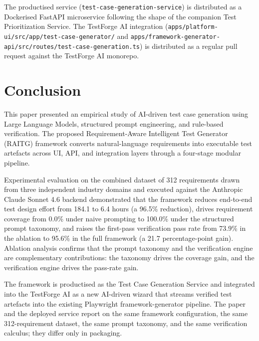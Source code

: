 \documentclass[conference]{IEEEtran}
\begin{document}
The productised service (\texttt{test-case-generation-service}) is distributed as a Dockerised FastAPI microservice following the shape of the companion Test Prioritization Service. The TestForge AI integration (\texttt{apps/platform-ui/src/app/test-case-generator/} and \texttt{apps/framework-generator-api/src/routes/test-case-generation.ts}) is distributed as a regular pull request against the TestForge AI monorepo.

\section{Conclusion}
\label{sec:conclusion}

This paper presented an empirical study of AI-driven test case generation using Large Language Models, structured prompt engineering, and rule-based verification. The proposed Requirement-Aware Intelligent Test Generator (RAITG) framework converts natural-language requirements into executable test artefacts across UI, API, and integration layers through a four-stage modular pipeline.

Experimental evaluation on the combined dataset of 312 requirements drawn from three independent industry domains and executed against the Anthropic Claude Sonnet 4.6 backend demonstrated that the framework reduces end-to-end test design effort from 184.1 to 6.4 hours (a 96.5\% reduction), drives requirement coverage from 0.0\% under naive prompting to 100.0\% under the structured prompt taxonomy, and raises the first-pass verification pass rate from 73.9\% in the ablation to 95.6\% in the full framework (a 21.7 percentage-point gain). Ablation analysis confirms that the prompt taxonomy and the verification engine are complementary contributions: the taxonomy drives the coverage gain, and the verification engine drives the pass-rate gain.

The framework is productised as the Test Case Generation Service and integrated into the TestForge AI as a new AI-driven wizard that streams verified test artefacts into the existing Playwright framework-generator pipeline. The paper and the deployed service report on the same framework configuration, the same 312-requirement dataset, the same prompt taxonomy, and the same verification calculus; they differ only in packaging.
\end{document}
